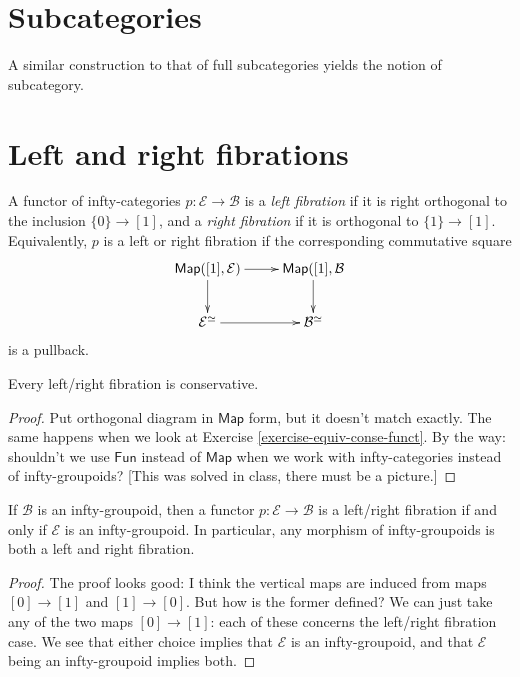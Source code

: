 \section{Subcategories}
\label{section-subcategories}

\noindent
A similar construction to that of full
subcategories
yields the notion of subcategory.

\section{Left and right fibrations}
\label{section-left-and-right-fibrations}

\begin{definition}
\label{definition-left-right-fibrations}
A functor of infty-categories
$p:\mathcal{E} \to \mathcal{B}$
is a {\it left fibration} if it is right
orthogonal to the
inclusion $\{0\}\to [1]$, and a {\it right
fibration}
if it is orthogonal to $\{1\}\to [1]$.
Equivalently, $p$ is a left or right
fibration if
the corresponding commutative square
$$
\xymatrix{
\mathsf{Map}([1],\mathcal{E})\ar[r]\ar[d]&
\mathsf{Map}([1],\mathcal{B}\ar[d]\\
\mathcal{E}^\simeq\ar[r]&\mathcal{B}^\simeq
}
$$
is a pullback.
\end{definition}

\begin{exercise}
\label{exercise-3.1}
Every left/right fibration is conservative.
\end{exercise}

\begin{proof}
Put orthogonal diagram in $\mathsf{Map}$
form,
but it doesn't match exactly.
The same happens when we look at
Exercise \ref{exercise-equiv-conse-funct}.
By the way: shouldn't we use $\mathsf{Fun}$
instead of $\mathsf{Map}$
when we work with infty-categories instead
of infty-groupoids?
[This was solved in class, there must be a
picture.]
\end{proof}

\begin{lemma}
\label{lemma-fibra-etale-space-group}
If $\mathcal{B}$ is an infty-groupoid,
then a functor $p:\mathcal{E} \to
\mathcal{B}$
is a left/right fibration if and only if
$\mathcal{E}$
is an infty-groupoid. In particular,
any morphism of infty-groupoids
is both a left and right fibration.
\end{lemma}

\begin{proof}
The proof looks good: I think the vertical
maps
are induced from maps $[0] \to [1]$ and $[1]
\to [0]$.
But how is the former defined? We can just
take
any of the two maps $[0]\to[1]$:
each of these concerns the left/right
fibration case.
We see that either choice implies that
$\mathcal{E}$ is
an infty-groupoid, and that $\mathcal{E}$
being an
infty-groupoid implies both.
\end{proof}

